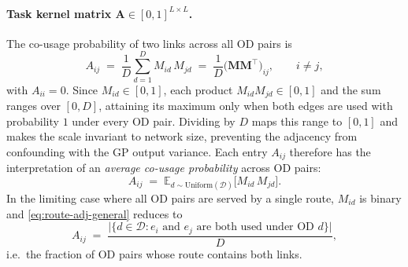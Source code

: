 \documentclass[11pt]{article}
\begin{document}
\paragraph{Task kernel matrix $\mathbf{A} \in [0,1]^{L \times L}$.}
The co-usage probability of two links across all OD pairs is
\begin{equation}
    A_{ij}
    \;=\;
    \frac{1}{D}
    \sum_{d=1}^{D} M_{id}\,M_{jd}
    \;=\;
    \frac{1}{D}
    \bigl(\mathbf{M}\mathbf{M}^{\top}\bigr)_{ij},
    \qquad i \neq j,
    \label{eq:route-adj-general}
\end{equation}
with $A_{ii}=0$.
Since $M_{id} \in [0,1]$, each product $M_{id}M_{jd} \in [0,1]$ and the
sum ranges over $[0,D]$, attaining its maximum only when both edges are used
with probability $1$ under every OD pair. Dividing by $D$ maps this range to
$[0,1]$ and makes the scale invariant to network size, preventing the
adjacency from confounding with the GP output variance. Each entry $A_{ij}$
therefore has the interpretation of an \emph{average co-usage probability}
across OD pairs:
\begin{equation}
    A_{ij}
    \;=\;
    \mathbb{E}_{d \sim \mathrm{Uniform}(\mathcal{D})}
    \bigl[M_{id}\,M_{jd}\bigr].
    \label{eq:Aij-expectation}
\end{equation}
In the limiting case where all OD pairs are served by a single route,
$M_{id}$ is binary and \eqref{eq:route-adj-general} reduces to
\begin{equation}
    A_{ij}
    \;=\;
    \frac{\bigl|\{d \in \mathcal{D} : e_i \text{ and } e_j
          \text{ are both used under OD } d\}\bigr|}{D},
    \label{eq:route-adj-binary}
\end{equation}
i.e.\ the fraction of OD pairs whose route contains both links.




\end{document}

